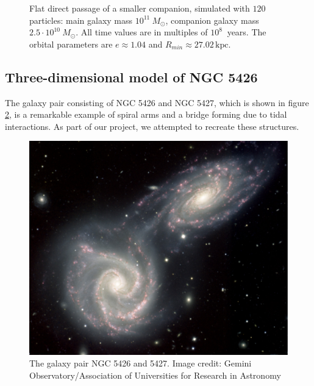 \documentclass[11pt,twocolumn]{article}
\newcommand{\unit}[1]{\ensuremath{\, \mathrm{#1}}}
\begin{document}
\begin{figure}[!htbp]
            
            \caption{Flat direct passage of a smaller companion, simulated with $120$ particles: main galaxy mass $10^{11}\: M_\odot$, companion galaxy mass $2.5 \cdot 10^{10}\: M_\odot$. All time values are in multiples of $10^8\:$ years.
            The orbital parameters are $e \approx 1.04$ and $R_{min} \approx 27.02\unit{kpc}$.} %
            \label{fig:fig4}
		\end{figure}
		
        
    \subsection{Three-dimensional model of NGC 5426}

The galaxy pair consisting of NGC 5426 and NGC 5427, which is shown in figure \ref{NGC5426n7}, is a remarkable example of spiral arms and a bridge forming due to tidal interactions. As part of our project, we attempted to recreate these structures. 
\begin{figure}[htbp]
\begin{center}
\includegraphics[width=\linewidth]{ngc5426/gemini-ngc5426n7small.jpg}
\caption{The galaxy pair NGC 5426 and 5427. Image credit: Gemini Observatory/Association of Universities for Research in Astronomy}
\label{NGC5426n7}
\end{center}
\end{figure}
        
\end{document}
